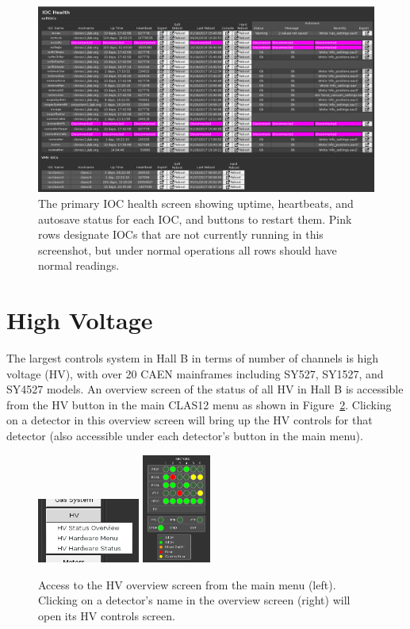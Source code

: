 \documentclass[amsmath,amssymb,notitlepage,11pt]{revtex4}
\begin{document}
\begin{figure}[htbp]\centering
  \includegraphics[width=\textwidth]{pics/iochealth}
  \caption{The primary IOC health screen showing uptime, heartbeats, and autosave status for each IOC, and buttons to restart them.  Pink rows designate IOCs that are not currently running in this screenshot, but under normal operations all rows should have normal readings.  \label{fig:iochealth}}
\end{figure}

\section{High Voltage}
The largest controls system in Hall B in terms of number of channels is high voltage (HV), with over 20 CAEN mainframes including SY527, SY1527, and SY4527 models.  An overview screen of the status of all HV in Hall B is accessible from the HV button in the main CLAS12 menu as shown in Figure~\ref{fig:hv}.  Clicking on a detector in this overview screen will bring up the HV controls for that detector (also accessible under each detector's button in the main menu).

\begin{figure}[htbp]\centering
  \includegraphics[width=0.3\textwidth]{pics/hvmenu}
  \includegraphics[width=0.2\textwidth]{pics/hvstat}
  \caption{Access to the HV overview screen from the main menu (left).  Clicking on a detector's name in the overview screen (right) will open its HV controls screen.\label{fig:hv}}
\end{figure}
\end{document}
